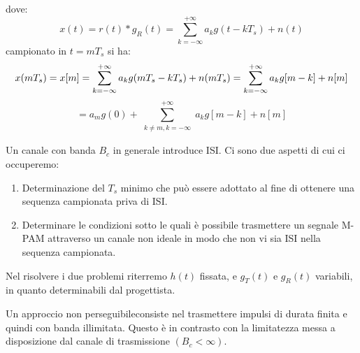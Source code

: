 \begin{center}
\end{center}

dove:
\[
    x(t) = r(t) \ast g_R(t) = \sum_{k=-\infty}^{+\infty} a_k g(t - kT_s) + n(t)
\]
campionato in $t = mT_s$ si ha:
\[
        x(mT_s) = x[m] = \sum_{k=-\infty}^{+\infty} a_k g(mT_s - kT_s) + n(mT_s) = \sum_{k=-\infty}^{+\infty} a_k g[m-k] + n[m] \\ 
 \]
\[
        = a_m g(0) + \sum_{\substack{k \neq m, k=-\infty}}^{+\infty} a_k g[m-k] + n[m]
\]



Un canale con banda \( B_c \) in generale introduce ISI. Ci sono due aspetti di cui ci occuperemo:

\begin{enumerate}
    \item Determinazione del \( T_s \) minimo che può essere adottato al fine di ottenere una sequenza campionata priva di ISI.
    \item Determinare le condizioni sotto le quali è possibile trasmettere un segnale M-PAM attraverso un canale non ideale in modo che non vi sia ISI nella sequenza campionata.
\end{enumerate}

Nel risolvere i due problemi riterremo \( h(t) \) fissata, e \( g_T(t) \) e \( g_R(t) \) variabili, in quanto determinabili dal progettista.

Un approccio non perseguibileconsiste nel trasmettere impulsi di durata finita e quindi con banda illimitata. Questo è in contrasto con la limitatezza messa a disposizione dal canale di trasmissione \( (B_c < \infty) \).

